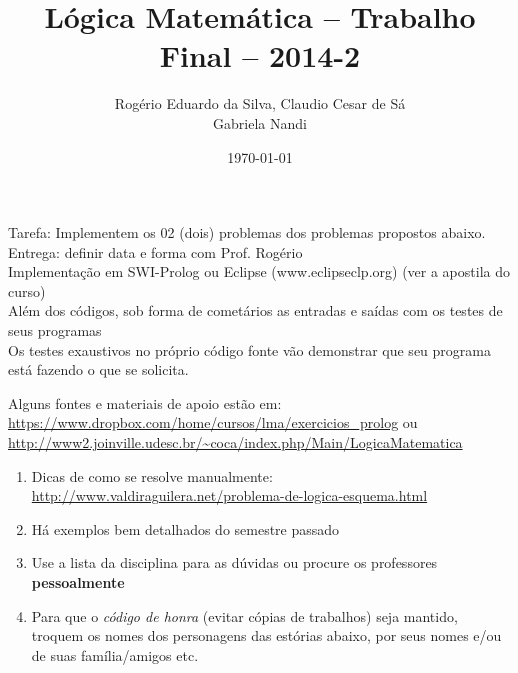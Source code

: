\documentclass[a4paper,12pt]{article}
\title{Lógica Matemática -- Trabalho Final -- 2014-2}
\author{Rogério Eduardo da Silva, Claudio Cesar de Sá\\ Gabriela Nandi}
\date{\today}
\begin{document}
\maketitle

\begin{flushleft}

 Tarefa: Implementem os  02 (dois)  problemas dos problemas propostos abaixo.\\
Entrega: definir data e forma com Prof. Rogério \\ 

 Implementação em SWI-Prolog ou Eclipse (www.eclipseclp.org) (ver a apostila do curso)\\

 Além dos códigos, sob forma de cometários as entradas e saídas com os testes de seus programas\\

 Os testes exaustivos no próprio código fonte vão demonstrar que seu programa está fazendo o que se solicita.


 Alguns fontes e materiais de apoio estão em:
 \url{https://www.dropbox.com/home/cursos/lma/exercicios_prolog} ou \\
  \url{http://www2.joinville.udesc.br/~coca/index.php/Main/LogicaMatematica}

\end{flushleft}

\begin{enumerate}
\setlength\itemsep{0.5cm}
\item Dicas de como se resolve manualmente:\\
\url{http://www.valdiraguilera.net/problema-de-logica-esquema.html}

\item Há exemplos bem detalhados do semestre passado\\

\item Use a lista da disciplina para as dúvidas ou procure
os professores \textbf{pessoalmente}\\

\item Para que o \textit{código de honra} (evitar cópias de trabalhos) seja mantido,
troquem os nomes dos personagens das estórias abaixo, por seus nomes e/ou de suas família/amigos etc. 

\end{enumerate}

\newpage
\tableofcontents
\end{document}
